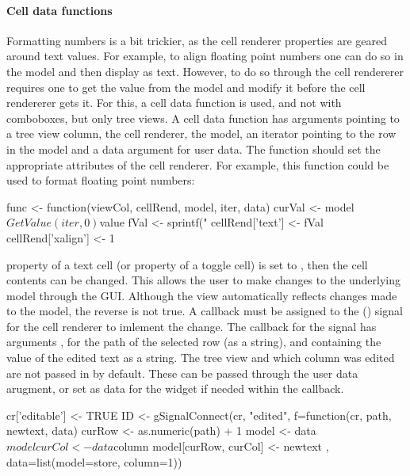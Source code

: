 \paragraph{Cell data functions}
Formatting numbers is a bit trickier, as the cell renderer properties
are geared around text values. For example, to align floating point
numbers one can do so in the model and then display as text. However,
to do so through the cell rendererer requires one to get the value
from the model and modify it before the cell rendererer gets it. For
this, a cell data function is used, and not with comboboxes, but only
tree views. A cell data function has arguments pointing to a tree view
column, the cell renderer, the model, an
iterator pointing to the row in the model and a data argument for user
data. The function should set the appropriate attributes of the cell
renderer. For example, this function could be used to format floating
point numbers:
\begin{Schunk}
\begin{Sinput}
 func <- function(viewCol, cellRend, model, iter, data) {
   curVal <- model$GetValue(iter, 0)$value
   fVal <- sprintf("%
   cellRend['text'] <- fVal
   cellRend['xalign'] <- 1
 }
\end{Sinput}
\end{Schunk}




property of a text cell (or  property of a toggle
cell) is set to , then the cell contents can be
changed. This allows the user to make changes to the underlying model
through the GUI. Although the view automatically reflects changes made
to the model, the reverse is not true. A callback must be assigned to
the  () signal for the cell renderer to
imlement the change. The callback for the  signal has
arguments ,  for the path of the selected
row (as a string), and  containing the value of the edited text as a
string. The tree view and which column was edited are not passed in by
default. These can be passed through the user data arugment, or set as
data for the widget if needed within the callback.
\begin{Schunk}
\begin{Sinput}
 cr['editable'] <- TRUE
 ID <- gSignalConnect(cr, "edited", 
                      f=function(cr, path, newtext, data) {
                        curRow <- as.numeric(path) + 1
                        model <- data$model
                        curCol <- data$column
                        model[curRow, curCol] <- newtext
                      }, data=list(model=store, column=1))
\end{Sinput}
\end{Schunk}

